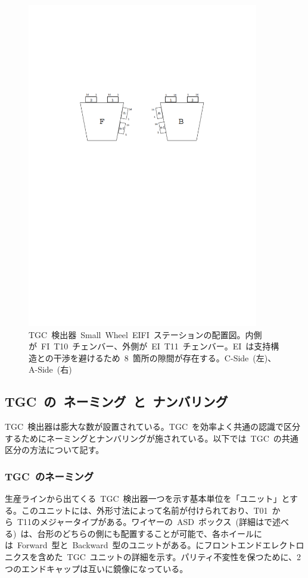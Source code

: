 \begin{figure}[tbp]
        \centering   
        \includegraphics[width=0.9\textwidth,page=4]{img/pdf/TGC.pdf}
        \caption[TGC 検出器~Small~Wheel~EIFI~ステーションの配置図]{TGC~検出器~Small~Wheel~EIFI~ステーションの配置図。内側が~FI~T10~チェンバー、外側が~EI~T11~チェンバー。EI~は支持構造との干渉を避けるため~8~箇所の隙間が存在する。C-Side~(左)、A-Side~(右)~\cite{TR:02}}
        \label{fig:tgcSW}
\end{figure}

\subsection{TGC~の~ネーミング~と~ナンバリング}
TGC~検出器は膨大な数が設置されている。TGC~を効率よく共通の認識で区分するためにネーミングとナンバリングが施されている。以下では~TGC~の共通区分の方法について記す。
\subsubsection{TGC~のネーミング}
生産ラインから出てくる~TGC~検出器一つを示す基本単位を「ユニット」とする。このユニットには、外形寸法によって名前が付けられており、T01~から~T11のメジャータイプがある。ワイヤーの~ASD~ボックス~(詳細はで述べる)~は、台形のどちらの側にも配置することが可能で、各ホイールには~Forward~型と~Backward~型のユニットがある。にフロントエンドエレクトロニクスを含めた~TGC~ユニットの詳細を示す。パリティ不変性を保つために、2つのエンドキャップは互いに鏡像になっている。

